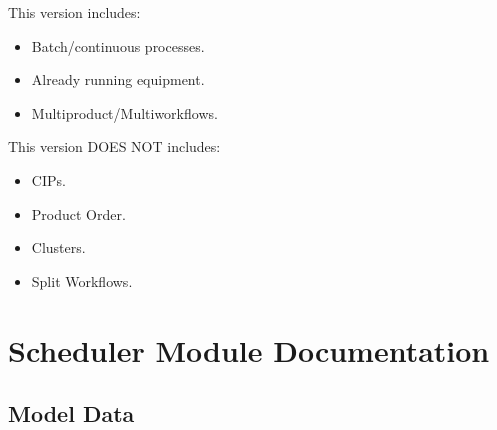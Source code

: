 \documentclass[letterpaper,10pt,english]{sphinxmanual}
\begin{document}
\sphinxAtStartPar
This version includes:
\begin{itemize}
\item {} 
\sphinxAtStartPar
Batch/continuous processes.

\item {} 
\sphinxAtStartPar
Already running equipment.

\item {} 
\sphinxAtStartPar
Multi\sphinxhyphen{}product/Multi\sphinxhyphen{}workflows.

\end{itemize}

\sphinxAtStartPar
This version DOES NOT includes:
\begin{itemize}
\item {} 
\sphinxAtStartPar
CIPs.

\item {} 
\sphinxAtStartPar
Product Order.

\item {} 
\sphinxAtStartPar
Clusters.

\item {} 
\sphinxAtStartPar
Split Workflows.

\end{itemize}


\chapter{Scheduler Module Documentation}
\label{\detokenize{index:scheduler-module-documentation}}

\section{Model Data}
\label{\detokenize{index:module-src.model_data}}\label{\detokenize{index:model-data}}\label{\detokenize{index:module-0}}
\end{document}
